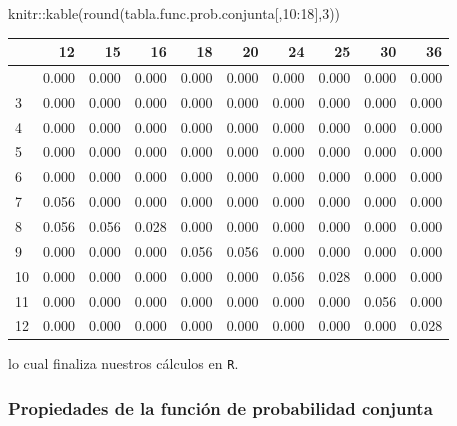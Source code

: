 \documentclass[
  letterpaper,
  DIV=11,
  numbers=noendperiod]{scrreprt}
\newenvironment{Shaded}{\begin{snugshade}}{\end{snugshade}}
\newcommand{\DecValTok}[1]{\textcolor[rgb]{0.68,0.00,0.00}{#1}}
\newcommand{\FunctionTok}[1]{\textcolor[rgb]{0.28,0.35,0.67}{#1}}
\newcommand{\NormalTok}[1]{\textcolor[rgb]{0.00,0.23,0.31}{#1}}
\newcommand{\SpecialCharTok}[1]{\textcolor[rgb]{0.37,0.37,0.37}{#1}}
\begin{document}
\begin{Shaded}
\begin{Highlighting}[]
\NormalTok{knitr}\SpecialCharTok{::}\FunctionTok{kable}\NormalTok{(}\FunctionTok{round}\NormalTok{(tabla.func.prob.conjunta[,}\DecValTok{10}\SpecialCharTok{:}\DecValTok{18}\NormalTok{],}\DecValTok{3}\NormalTok{))}
\end{Highlighting}
\end{Shaded}

\begin{longtable}[]{@{}lrrrrrrrrr@{}}
\toprule\noalign{}
& 12 & 15 & 16 & 18 & 20 & 24 & 25 & 30 & 36 \\
\midrule\noalign{}
\endhead
\bottomrule\noalign{}
\endlastfoot
2 & 0.000 & 0.000 & 0.000 & 0.000 & 0.000 & 0.000 & 0.000 & 0.000 &
0.000 \\
3 & 0.000 & 0.000 & 0.000 & 0.000 & 0.000 & 0.000 & 0.000 & 0.000 &
0.000 \\
4 & 0.000 & 0.000 & 0.000 & 0.000 & 0.000 & 0.000 & 0.000 & 0.000 &
0.000 \\
5 & 0.000 & 0.000 & 0.000 & 0.000 & 0.000 & 0.000 & 0.000 & 0.000 &
0.000 \\
6 & 0.000 & 0.000 & 0.000 & 0.000 & 0.000 & 0.000 & 0.000 & 0.000 &
0.000 \\
7 & 0.056 & 0.000 & 0.000 & 0.000 & 0.000 & 0.000 & 0.000 & 0.000 &
0.000 \\
8 & 0.056 & 0.056 & 0.028 & 0.000 & 0.000 & 0.000 & 0.000 & 0.000 &
0.000 \\
9 & 0.000 & 0.000 & 0.000 & 0.056 & 0.056 & 0.000 & 0.000 & 0.000 &
0.000 \\
10 & 0.000 & 0.000 & 0.000 & 0.000 & 0.000 & 0.056 & 0.028 & 0.000 &
0.000 \\
11 & 0.000 & 0.000 & 0.000 & 0.000 & 0.000 & 0.000 & 0.000 & 0.056 &
0.000 \\
12 & 0.000 & 0.000 & 0.000 & 0.000 & 0.000 & 0.000 & 0.000 & 0.000 &
0.028 \\
\end{longtable}

lo cual finaliza nuestros cálculos en \texttt{R}.

\hypertarget{propiedades-de-la-funciuxf3n-de-probabilidad-conjunta}{%
\subsubsection{Propiedades de la función de probabilidad
conjunta}\label{propiedades-de-la-funciuxf3n-de-probabilidad-conjunta}}
\end{document}
